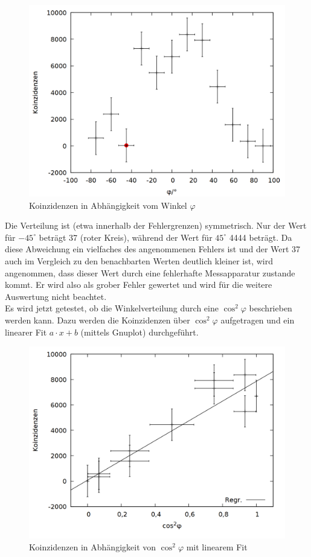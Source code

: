 \begin{figure}
\centering
\includegraphics[width=0.75\linewidth]{data/friedrich/winkel.png}
\caption{Koinzidenzen in Abhängigkeit vom Winkel $\varphi$}
\label{fig:winkel}
\end{figure}

Die Verteilung ist (etwa innerhalb der Fehlergrenzen) symmetrisch. Nur der Wert für $-45^\circ$ beträgt 37 (roter Kreis), während der Wert für $45^\circ$ 4444 beträgt. Da diese Abweichung ein vielfaches des angenommenen Fehlers ist und der Wert 37 auch im Vergleich zu den benachbarten Werten deutlich kleiner ist, wird angenommen, dass dieser Wert durch eine fehlerhafte Messapparatur zustande kommt. Er wird also als grober Fehler gewertet und wird für die weitere Auswertung nicht beachtet.\\

Es wird jetzt getestet, ob die Winkelverteilung durch eine $\cos^2{\varphi}$ beschrieben werden kann. Dazu werden die Koinzidenzen über $\cos^2{\varphi}$ aufgetragen und ein linearer Fit $a\cdot x + b$ (mittels Gnuplot) durchgeführt. \\

\begin{figure}
\centering
\includegraphics[width=0.75\linewidth]{data/friedrich/winkel_cos.png}
\caption{Koinzidenzen in Abhängigkeit von $\cos^2{\varphi}$ mit linearem Fit}
\label{fig:winkel_cos}
\end{figure}

